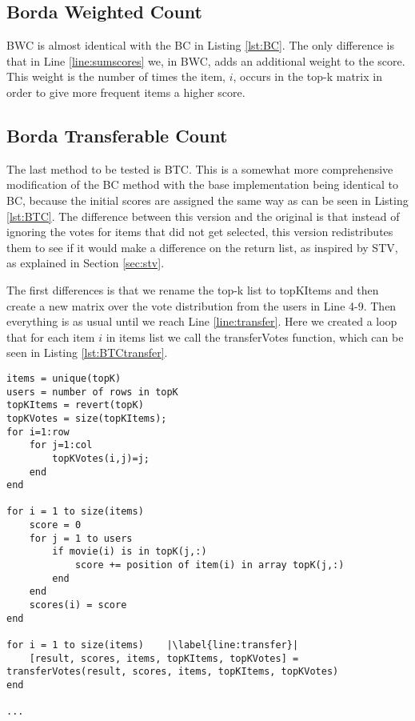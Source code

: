 \subsection{Borda Weighted Count}
BWC is almost identical with the BC in Listing \ref{lst:BC}. The only difference is that in Line \ref{line:sumscores} we, in BWC, adds an additional weight to the score. This weight is the number of times the item, $i$, occurs in the top-k matrix in order to give more frequent items a higher score.

\subsection{Borda Transferable Count} \label{sec:BTC}
The last method to be tested is BTC. This is a somewhat more comprehensive modification of the BC method with the base implementation being identical to BC, because the initial scores are assigned the same way as can be seen in Listing \ref{lst:BTC}. The difference between this version and the original is that instead of ignoring the votes for items that did not get selected, this version redistributes them to see if it would make a difference on the return list, as inspired by STV, as explained in Section \ref{sec:stv}.

The first differences is that we rename the top-k list to topKItems and then create a new matrix over the vote distribution from the users in Line 4-9. Then everything is as usual until we reach Line \ref{line:transfer}. Here we created a loop that for each item $i$ in items list we call the transferVotes function, which can be seen in Listing \ref{lst:BTCtransfer}.


\begin{lstlisting}[caption={Borda Transferable Count implementation},label=lst:BTC,escapechar=|]
items = unique(topK)
users = number of rows in topK
topKItems = revert(topK)
topKVotes = size(topKItems);
for i=1:row
    for j=1:col
        topKVotes(i,j)=j;
    end 
end

for i = 1 to size(items)
	score = 0
	for j = 1 to users
		if movie(i) is in topK(j,:)
			score += position of item(i) in array topK(j,:)
		end
	end
	scores(i) = score
end

for i = 1 to size(items)	|\label{line:transfer}|
	[result, scores, items, topKItems, topKVotes] = transferVotes(result, scores, items, topKItems, topKVotes)
end
	
...
\end{lstlisting}

